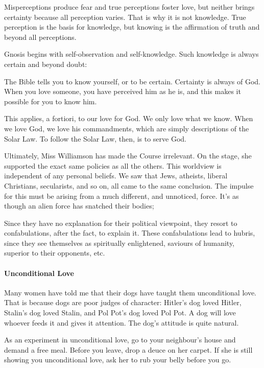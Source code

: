 \begin{quotex}
Misperceptions produce fear and true perceptions foster love, but neither brings certainty because all perception varies. That is why it is not knowledge. True perception is the basis for knowledge, but knowing is the affirmation of truth and beyond all perceptions.

\end{quotex}
Gnosis begins with self-observation and self-knowledge. Such knowledge is always certain and beyond doubt:

\begin{quotex}
The Bible tells you to know yourself, or to be certain. Certainty is always of God. When you love someone, you have perceived him as he is, and this makes it possible for you to know him.

\end{quotex}
This applies, a fortiori, to our love for God. We only love what we know. When we love God, we love his commandments, which are simply descriptions of the Solar Law. To follow the Solar Law, then, is to serve God.

Ultimately, Miss Williamson has made the Course irrelevant. On the stage, she supported the exact same policies as all the others. This worldview is independent of any personal beliefs. We saw that Jews, atheists, liberal Christians, secularists, and so on, all came to the same conclusion. The impulse for this must be arising from a much different, and unnoticed, force. It's as though an alien force has snatched their bodies;

Since they have no explanation for their political viewpoint, they resort to confabulations, after the fact, to explain it. These confabulations lead to hubris, since they see themselves as spiritually enlightened, saviours of humanity, superior to their opponents, etc.

\paragraph{Unconditional Love}
Many women have told me that their dogs have taught them unconditional love. That is because dogs are poor judges of character: Hitler's dog loved Hitler, Stalin's dog loved Stalin, and Pol Pot's dog loved Pol Pot. A dog will love whoever feeds it and gives it attention. The dog's attitude is quite natural.

As an experiment in unconditional love, go to your neighbour's house and demand a free meal. Before you leave, drop a deuce on her carpet. If she is still showing you unconditional love, ask her to rub your belly before you go.

